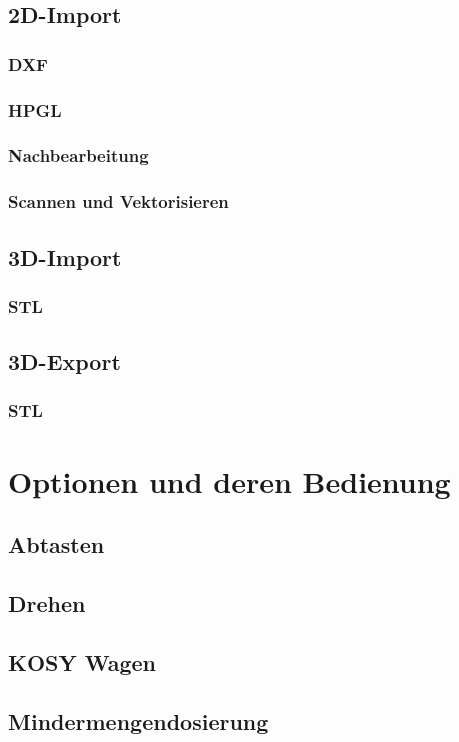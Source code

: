 \documentclass[a4paper]{book}
\begin{document}
	\section{2D-Import} 
		\subsection{DXF}
		\subsection{HPGL} 
		\subsection{Nachbearbeitung} 
		\subsection{Scannen und Vektorisieren} 
	\section{3D-Import} 
		\subsection{STL}
	\section{3D-Export} 
		\subsection{STL}

\chapter{Optionen und deren Bedienung} 
	\section{Abtasten}
	\section{Drehen} 
	\section{KOSY Wagen} 
	\section{Mindermengendosierung} 
\end{document}
